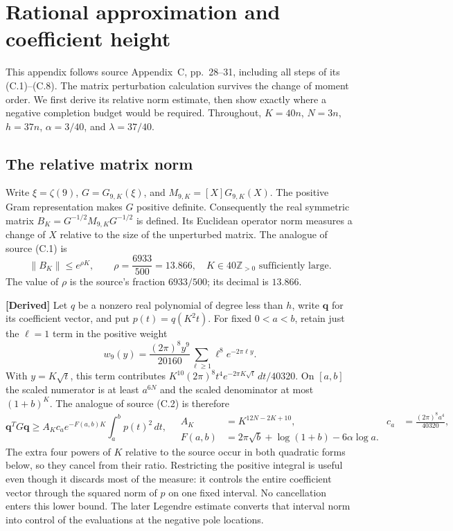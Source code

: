 \section{Rational approximation and coefficient height}
\label{c-approximation}

This appendix follows source Appendix~C, pp.~28--31, including all steps
of its (C.1)--(C.8).  The matrix perturbation calculation survives the
change of moment order.  We first derive its relative norm estimate,
then show exactly where a negative completion budget would be required.
Throughout, $K=40n$, $N=3n$, $h=37n$, $\alpha=3/40$, and $\lambda=37/40$.

\subsection{The relative matrix norm}
\label{c-relative-norm}

Write $\xi=\zeta(9)$, $G=G_{9,K}(\xi)$, and
$M_{9,K}=[X]G_{9,K}(X)$.  The positive Gram representation makes $G$
positive definite.  Consequently the real symmetric matrix
$B_K=G^{-1/2}M_{9,K}G^{-1/2}$ is defined.  Its Euclidean operator norm
measures a change of $X$ relative to the size of the unperturbed matrix.
The analogue of source (C.1) is
\begin{equation}
 \|B_K\|\leq e^{\rho K},\qquad
 \rho=\frac{6933}{500}=13.866,
 \quad K\in40\mathbb Z_{>0}\text{ sufficiently large}.
 \label{c-norm-bound}
\end{equation}
The value of $\rho$ is the source's fraction $6933/500$; its decimal is
$13.866$.

\noindent\textbf{[Derived]} Let $q$ be a nonzero real polynomial of
degree less than $h$, write $\mathbf q$ for its coefficient vector, and
put $p(t)=q(K^2t)$.  For fixed $0<a<b$, retain just the $\ell=1$ term in
the positive weight
\[
 w_9(y)=\frac{(2\pi)^8y^9}{20160}
          \sum_{\ell\geq1}\ell^8e^{-2\pi\ell y}.
\]
With $y=K\sqrt t$, this term contributes
$K^{10}(2\pi)^8t^4e^{-2\pi K\sqrt t}\,dt/40320$.
On $[a,b]$ the scaled numerator is at least $a^{6N}$ and the scaled
denominator at most $(1+b)^K$.  The analogue of source (C.2) is therefore
\begin{equation}
 \mathbf q^TG\mathbf q\geq
 A_Kc_a e^{-F(a,b)K}\int_a^b p(t)^2\,dt,
 \quad
 \begin{aligned}
 A_K&=K^{12N-2K+10},&
 c_a&=\frac{(2\pi)^8a^4}{40320},\\
 F(a,b)&=2\pi\sqrt b+\log(1+b)-6\alpha\log a.
 \end{aligned}
 \label{c-gram-lower}
\end{equation}
The extra four powers of $K$ relative to the source occur in both
quadratic forms below, so they cancel from their ratio.
Restricting the positive integral is useful even though it discards
most of the measure: it controls the entire coefficient vector through
the squared norm of $p$ on one fixed interval.  No cancellation enters
this lower bound.  The later Legendre estimate converts that interval
norm into control of the evaluations at the negative pole locations.

